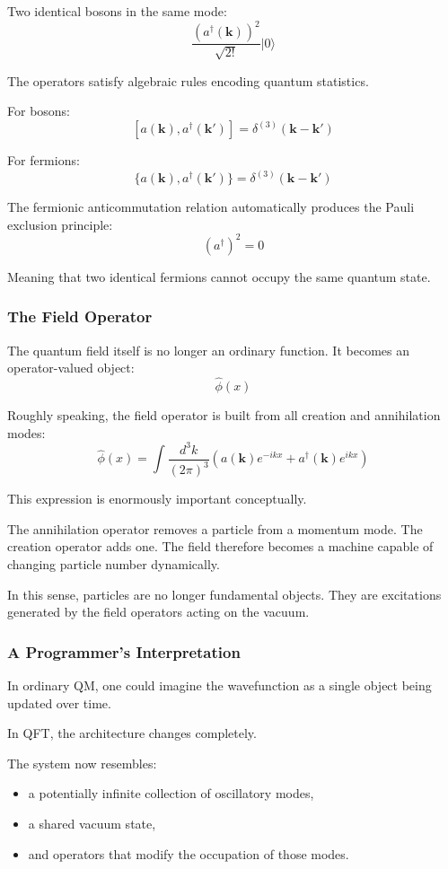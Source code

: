 Two identical bosons in the same mode:
\[
\frac{(a^\dagger(\mathbf{k}))^2}{\sqrt{2!}} |0\rangle
\]

The operators satisfy algebraic rules encoding quantum statistics.

For bosons:
\[
[a(\mathbf{k}), a^\dagger(\mathbf{k}')] =
\delta^{(3)}(\mathbf{k}-\mathbf{k}')
\]

For fermions:
\[
\{a(\mathbf{k}), a^\dagger(\mathbf{k}')\} =
\delta^{(3)}(\mathbf{k}-\mathbf{k}')
\]

The fermionic anticommutation relation automatically produces the Pauli exclusion principle:
\[
(a^\dagger)^2 = 0
\]

Meaning that two identical fermions cannot occupy the same quantum state.

\subsubsection*{The Field Operator}

The quantum field itself is no longer an ordinary function.
It becomes an operator-valued object:
\[
\hat{\phi}(x)
\]

Roughly speaking, the field operator is built from all creation and annihilation modes:
\[
\hat{\phi}(x)
=
\int \frac{d^3k}{(2\pi)^3}
\left(
a(\mathbf{k}) e^{-ikx}
+
a^\dagger(\mathbf{k}) e^{ikx}
\right)
\]

This expression is enormously important conceptually.

The annihilation operator removes a particle from a momentum mode.
The creation operator adds one.
The field therefore becomes a machine capable of changing particle number dynamically.

In this sense, particles are no longer fundamental objects.
They are excitations generated by the field operators acting on the vacuum.

\subsubsection*{A Programmer's Interpretation}

In ordinary QM, one could imagine the wavefunction as a single object being updated over time.

In QFT, the architecture changes completely.

The system now resembles:
\begin{itemize}
\item a potentially infinite collection of oscillatory modes,
\item a shared vacuum state,
\item and operators that modify the occupation of those modes.
\end{itemize}

